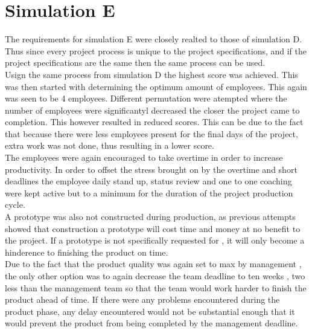 \documentclass{article}
\begin{document}
\section{Simulation E}


The requirements for simulation E were closely realted to those of simulation D. Thus since every project process is unique to the project specifications, and if the project specifications are the same then the same process can be used.\\
Usign the same process from simulation D the highest score was achieved. This was then started with determining the optimum amount of employees. This again was seen to be 4 employees. Different permutation were atempted where the number of employees were significantyl decreased the closer the project came to completion. This however resulted in reduced scores. This can be due to the fact that because there were less employees present for the final days of the project, extra work was not done, thus resulting in a lower score.\\
The employees were again encouraged to take overtime in order to increase productivity. In order to offset the stress brought on by the overtime and short deadlines the employee daily stand up, status review and one to one coaching were kept active but to a minimum for the duration of the project production cycle. \\
A prototype was also not constructed during production, as previous attempts showed that construction a prototype will cost time and money at no benefit to the project. If a prototype is not specifically requested for , it will only become a hinderence to finishing the product on time.\\
Due to the fact that the product quality was again set to max by management , the only other option was to again decrease the team deadline to ten weeks ,  two less than the management team so that the team would work harder to finish the product ahead of time. If there were any problems encountered during the product phase, any delay encountered would not be substantial enough that it would prevent the product from being completed by the management deadline.\\


 







	
\end{document}
